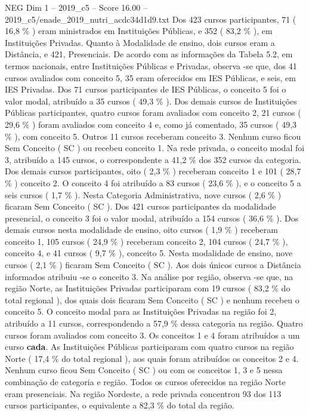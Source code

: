 \begin{textsample}{NEG Dim 1 – 2019\_c5 – Score 16.00 – 2019\_c5/enade\_2019\_nutri\_acdc34d1d9.txt}
Dos 423 cursos participantes, 71 ( 16,8 \% ) eram ministrados em Instituições Públicas, e 352 ( 83,2 \% ), em Instituições Privadas.
Quanto à Modalidade de ensino, dois cursos eram a Distância, e 421, Presenciais.
De acordo com as informações da Tabela 5.2, em termos nacionais, entre Instituições Públicas e Privadas, observa -se que, dos 41 cursos avaliados com conceito 5, 35 eram oferecidos em IES Públicas, e seis, em IES Privadas.
Dos 71 cursos participantes de IES Públicas, o conceito 5 foi o valor modal, atribuído a 35 cursos ( 49,3 \% ).
Dos demais cursos de Instituições Públicas participantes, quatro cursos foram avaliados com conceito 2, 21 cursos ( 29,6 \% ) foram avaliados com conceito 4 e, como já comentado, 35 cursos ( 49,3 \% ), com conceito 5.
Outros 11 cursos receberam conceito 3.
Nenhum curso ficou Sem Conceito ( SC ) ou recebeu conceito 1.
Na rede privada, o conceito modal foi 3, atribuído a 145 cursos, o correspondente a 41,2 \% dos 352 cursos da categoria.
Dos demais cursos participantes, oito ( 2,3 \% ) receberam conceito 1 e 101 ( 28,7 \% ) conceito 2.
O conceito 4 foi atribuído a 83 cursos ( 23,6 \% ), e o conceito 5 a seis cursos ( 1,7 \% ).
Nesta Categoria Administrativa, nove cursos ( 2,6 \% ) ficaram Sem Conceito ( SC ).
Dos 421 cursos participantes da modalidade presencial, o conceito 3 foi o valor modal, atribuído a 154 cursos ( 36,6 \% ).
Dos demais cursos nesta modalidade de ensino, oito cursos ( 1,9 \% ) receberam conceito 1, 105 cursos ( 24,9 \% ) receberam conceito 2, 104 cursos ( 24,7 \% ), conceito 4, e 41 cursos ( 9,7 \% ), conceito 5.
Nesta modalidade de ensino, nove cursos ( 2,1 \% ) ficaram Sem Conceito ( SC ).
Aos dois únicos cursos a Distância informados atribuiu -se o conceito 3.
Na análise por região, observa -se que, na região Norte, as Instituições Privadas participaram com 19 cursos ( 83,2 \% do total regional ), dos quais dois ficaram Sem Conceito ( SC ) e nenhum recebeu o conceito 5.
O conceito modal para as Instituições Privadas na região foi 2, atribuído a 11 cursos, correspondendo a 57,9 \% dessa categoria na região.
Quatro cursos foram avaliados com conceito 3.
Os conceitos 1 e 4 foram atribuídos a um curso \textbf{cada}.
As Instituições Públicas participaram com quatro cursos na região Norte ( 17,4 \% do total regional ), aos quais foram atribuídos os conceitos 2 e 4.
Nenhum curso ficou Sem Conceito ( SC ) ou com os conceitos 1, 3 e 5 nessa combinação de categoria e região.
Todos os cursos oferecidos na região Norte eram presenciais.
Na região Nordeste, a rede privada concentrou 93 dos 113 cursos participantes, o equivalente a 82,3 \% do total da região.

\end{textsample}

